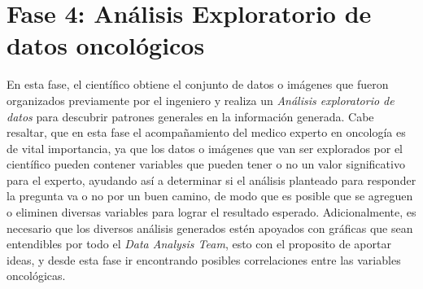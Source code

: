 \section{Fase 4: Análisis Exploratorio de datos oncológicos}

En esta fase, el científico obtiene el conjunto de datos o imágenes que fueron organizados previamente por el ingeniero y realiza un \textit{Análisis exploratorio de datos} para descubrir patrones generales en la información generada. Cabe resaltar, que en esta fase el acompañamiento del medico experto en oncología es de vital importancia, ya que los datos o imágenes que van ser explorados por el científico pueden contener variables que pueden tener o no un valor significativo para el experto, ayudando así a determinar si el análisis planteado para responder la pregunta va o no por un buen camino, de modo que es posible que se agreguen o eliminen diversas variables para lograr el resultado esperado. Adicionalmente, es necesario que los diversos análisis generados estén apoyados con gráficas que sean entendibles por todo el \textit{Data Analysis Team}, esto con el proposito de aportar ideas, y desde esta fase ir encontrando posibles correlaciones entre las variables oncológicas.

